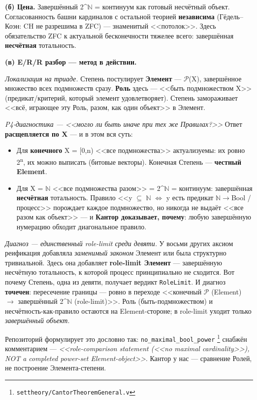 \documentclass[11pt,a4paper]{article}
\begin{document}
\textbf{(б) Цена.} Завершённый 2\textasciicircum{}$\mathbb{N}$ = континуум как готовый несчётный объект. Согласованность башни кардиналов с остальной теорией \textbf{независима} (Гёдель--Коэн: CH не разрешима в ZFC) --- знаменитый <<потолок>>. Здесь обязательство ZFC к актуальной бесконечности тяжелее всего: завершённая \textbf{несчётная} тотальность.

\textbf{(в) E/R/R разбор --- метод в действии.}

\emph{Локализация на триаде.} Степень постулирует \textbf{Элемент} --- $\mathcal{P}$(X), завершённое множество всех подмножеств сразу. \textbf{Роль} здесь --- <<быть подмножеством X>> (предикат/критерий, который элемент удовлетворяет). Степень замораживает <<всё, играющее эту Роль, разом, как один объект>> в Элемент.

\emph{P4-диагностика --- <<могло ли быть иначе при тех же Правилах?>>} Ответ \textbf{расщепляется по X} --- и в этом вся суть:
\begin{itemize}
\item Для \textbf{конечного} X = [0,n) <<все подмножества>> актуализуемы: их ровно 2\textsuperscript{n}, их можно выписать (битовые векторы). Конечная Степень --- \textbf{честный Element}.
\item Для X = $\mathbb{N}$ <<все подмножества разом>> = 2\textasciicircum{}$\mathbb{N}$ = континуум: завершённая \textbf{несчётная} тотальность. Правило <<y $\subseteq$ $\mathbb{N}$ $\Longleftrightarrow$ y есть предикат $\mathbb{N}$$\to$Bool / процесс>> порождает каждое подмножество, но никогда не выдаёт <<все разом как объект>> --- и \textbf{Кантор доказывает, почему}: любую завершённую нумерацию обходит диагональное правило.
\end{itemize}

\emph{Диагноз --- единственный role-limit среди девяти.} У восьми других аксиом реификация добавляла \emph{заменимый законом} Элемент или была структурно тривиальной. Здесь она добавляет \textbf{role-limit Элемент} --- завершённую несчётную тотальность, к которой процесс принципиально не сходится. Вот почему Степень, одна из девяти, получает вердикт \texttt{Role\allowbreak{}Limit}. И диагноз \textbf{точечен}: пересечение границы --- ровно в переходе <<конечный $\mathcal{P}$ (Element) $\to$ завершённый 2\textasciicircum{}$\mathbb{N}$ (role-limit)>>. Роль (быть-подмножеством) и несчётность-как-правило остаются на Element-стороне; в role-limit уходит только \emph{завершённый объект}.

Репозиторий формулирует это дословно так: \texttt{no\_\allowbreak{}maximal\_\allowbreak{}bool\_\allowbreak{}power} \footnote{\texttt{settheory/\allowbreak{}Cantor\allowbreak{}Theorem\allowbreak{}General.v}} снабжён комментарием --- \emph{<<role-comparison statement (<<no maximal cardinality>>), NOT a completed power-set Element-object>>}. Кантор у нас --- сравнение Ролей, не построение Элемента-степени.
\end{document}
